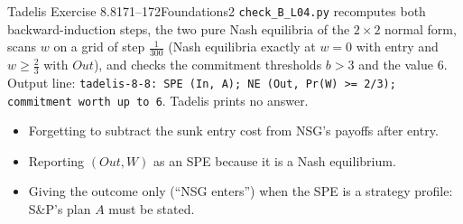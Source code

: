 \begin{exsol}{Tadelis Exercise 8.8}{171--172}{Foundations}{2}
\verify \texttt{check\_B\_L04.py} recomputes both backward-induction steps, the two pure Nash
equilibria of the $2\times2$ normal form, scans $w$ on a grid of step $\frac1{300}$ (Nash equilibria
exactly at $w = 0$ with entry and $w \ge \frac23$ with $\mathit{Out}$), and checks the commitment
thresholds $b > 3$ and the value $6$. Output line: \texttt{tadelis-8-8: SPE (In, A); NE (Out, Pr(W)
>= 2/3); commitment worth up to 6}. Tadelis prints no answer.

\mistakes
\begin{itemize}
  \item Forgetting to subtract the sunk entry cost from NSG's payoffs after entry.
  \item Reporting $(\mathit{Out}, W)$ as an SPE because it is a Nash equilibrium.
  \item Giving the outcome only (``NSG enters'') when the SPE is a strategy profile: S\&P's plan
  $A$ must be stated.
\end{itemize}

\end{exsol}
